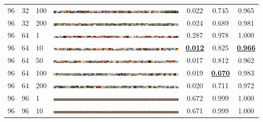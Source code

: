 \documentclass[a4paper]{article}
\begin{document}
\begin{table}[h!]
\begin{center}
{\begin{tabular}{lllcccc}
      96 & 32 & 100 & \includegraphics[width=\textwidth,trim={1536px 0 0 0},clip]{figures/bedrooms_g96_d32_ep100_generator.jpg}  & 0.022 & 0.745 & 0.965\\
      96 & 32 & 200 & \includegraphics[width=\textwidth,trim={1536px 0 0 0},clip]{figures/bedrooms_g96_d32_ep200_generator.jpg}  & 0.024 & 0.689 & 0.981\\
      \hline
      96 & 64 & 1   & \includegraphics[width=\textwidth,trim={1536px 0 0 0},clip]{figures/bedrooms_g96_d64_ep1_generator.jpg}    & 0.287 & 0.978 & 1.000\\
      96 & 64 & 10  & \includegraphics[width=\textwidth,trim={1536px 0 0 0},clip]{figures/bedrooms_g96_d64_ep10_generator.jpg}   & \underline{\bf 0.012} & 0.825 & \underline{\bf 0.966}\\
      96 & 64 & 50  & \includegraphics[width=\textwidth,trim={1536px 0 0 0},clip]{figures/bedrooms_g96_d64_ep50_generator.jpg}   & 0.017 & 0.812 & 0.962\\
      96 & 64 & 100 & \includegraphics[width=\textwidth,trim={1536px 0 0 0},clip]{figures/bedrooms_g96_d64_ep100_generator.jpg}  & 0.019 & \underline{\bf 0.670} & 0.983\\
      96 & 64 & 200 & \includegraphics[width=\textwidth,trim={1536px 0 0 0},clip]{figures/bedrooms_g96_d64_ep200_generator.jpg}  & 0.020 & 0.711 & 0.972\\
      \hline
      96 & 96 & 1   & \includegraphics[width=\textwidth,trim={1536px 0 0 0},clip]{figures/bedrooms_g96_d96_ep1_generator.jpg}    & 0.672 & 0.999 & 1.000\\
      96 & 96 & 10  & \includegraphics[width=\textwidth,trim={1536px 0 0 0},clip]{figures/bedrooms_g96_d96_ep10_generator.jpg}   & 0.671 & 0.999 & 1.000\\

\end{tabular}}
\end{center}
\end{table}
\end{document}
